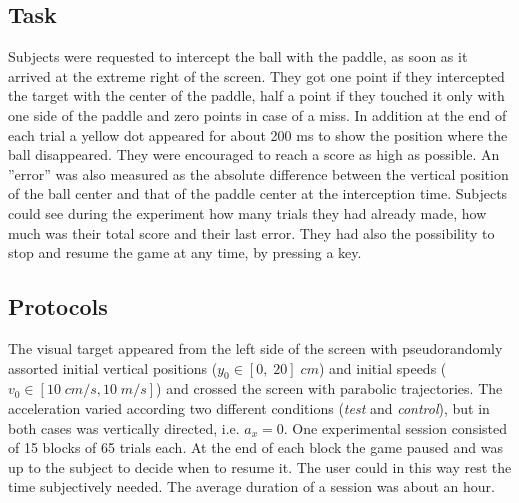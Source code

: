 
\subsection{Task}

Subjects were requested to intercept the ball with the paddle, as soon as it arrived at the extreme right of the screen.  They got one point if they intercepted the target with the center of the paddle, half a point if they touched it only with one side of the paddle and zero points in case of a miss. In addition at the end of each trial a yellow dot appeared for about 200 ms to show the position where the ball disappeared. They were encouraged to reach a score as high as possible. An ''error'' was also measured as the absolute difference between the vertical position of the ball center and that of the paddle center at the interception time. Subjects could see during the experiment how many trials they had already made, how much was their total score and their last error. They had also the possibility to stop and resume the game at any time, by pressing a key.


\subsection{Protocols}

The visual target appeared from the left side of the screen with pseudorandomly assorted initial vertical positions
($y_0 \in \left[0,\;20\right]\;cm $) and initial speeds ($v_0 \in \left[10\; cm/s, 10\; m/s \right]$) and crossed the screen with parabolic trajectories. The acceleration varied according two different conditions (\textit{test} and \textit{control}), but in both cases was vertically directed, i.e. $a_x=0$. One experimental session consisted of 15 blocks of 65 trials each. At the end of each block the game paused and was up to the subject to decide when to resume it. The user could in this way rest the time subjectively needed. The average duration of a session was about an hour.

